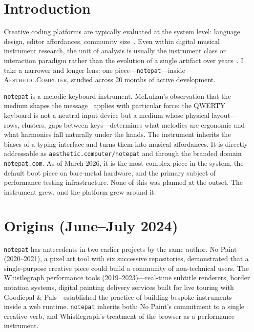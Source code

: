 \documentclass[10pt,letterpaper,twocolumn]{article}
\newcommand{\ac}{\textsc{Aesthetic.Computer}}
\begin{document}
\section{Introduction}

Creative coding platforms are typically evaluated at the system level: language design, editor affordances, community size~\citep{reas2007processing,mccarthy2015p5js,resnick2009scratch}. Even within digital musical instrument research, the unit of analysis is usually the instrument class or interaction paradigm rather than the evolution of a single artifact over years~\citep{magnusson2010designing,marquez2018dmi}. I take a narrower and longer lens: one piece---\texttt{notepat}---inside \ac{}, studied across 20 months of active development.

\texttt{notepat} is a melodic keyboard instrument. McLuhan's observation that the medium shapes the message~\citep{mcluhan1964understanding} applies with particular force: the QWERTY keyboard is not a neutral input device but a medium whose physical layout---rows, clusters, gaps between keys---determines what melodies are ergonomic and what harmonies fall naturally under the hands. The instrument inherits the biases of a typing interface and turns them into musical affordances. It is directly addressable as \texttt{aesthetic.computer/notepat} and through the branded domain \texttt{notepat.com}. As of March 2026, it is the most complex piece in the system, the default boot piece on bare-metal hardware, and the primary subject of performance testing infrastructure. None of this was planned at the outset. The instrument grew, and the platform grew around it.

\section{Origins (June--July 2024)}

\texttt{notepat} has antecedents in two earlier projects by the same author. No Paint (2020--2021), a pixel art tool with six successive repositories, demonstrated that a single-purpose creative piece could build a community of non-technical users. The Whistlegraph performance tools (2019--2023)---real-time subtitle renderers, border notation systems, digital painting delivery services built for live touring with Goodiepal \& Pals---established the practice of building bespoke instruments inside a web runtime. \texttt{notepat} inherits both: No Paint's commitment to a single creative verb, and Whistlegraph's treatment of the browser as a performance instrument.
\end{document}
